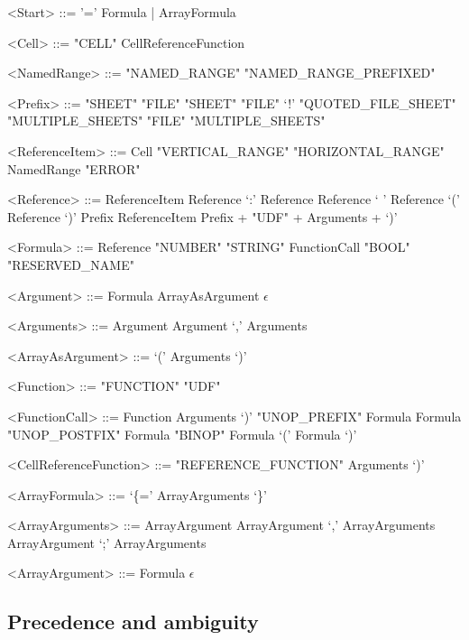 \documentclass[conference]{IEEEtran}
\begin{document}
\begin{grammar}
<Start> ::= '=' Formula | ArrayFormula


%
%
%
%

<Cell> ::= "CELL"
	  \alt CellReferenceFunction


<NamedRange> ::= "NAMED_RANGE"
            \alt "NAMED_RANGE_PREFIXED"

<Prefix> ::= "SHEET"
	\alt "FILE" "SHEET"
	\alt "FILE" `!'
	\alt "QUOTED_FILE_SHEET"
	\alt "MULTIPLE_SHEETS"
	\alt "FILE" "MULTIPLE_SHEETS"

<ReferenceItem> ::= Cell
	\alt "VERTICAL_RANGE"
	\alt "HORIZONTAL_RANGE"
	\alt NamedRange
	\alt "ERROR" 

<Reference> ::= ReferenceItem
	\alt Reference `:' Reference
	\alt Reference ` ' Reference
	\alt `(' Reference `)'
	\alt Prefix ReferenceItem
              \alt Prefix + "UDF" + Arguments + `)'
              
<Formula> ::= Reference
         \alt "NUMBER"
         \alt "STRING"
         \alt FunctionCall
         \alt "BOOL"
         \alt "RESERVED_NAME"

<Argument> ::= Formula
\alt ArrayAsArgument
\alt $\epsilon$

<Arguments> ::= Argument
\alt Argument `,' Arguments

<ArrayAsArgument> ::= `(' Arguments `)'

<Function> ::= "FUNCTION"
	\alt "UDF"

<FunctionCall> ::= Function Arguments `)'
\alt "UNOP_PREFIX" Formula
\alt Formula "UNOP_POSTFIX"
\alt Formula "BINOP" Formula
\alt `(' Formula `)'

<CellReferenceFunction> ::= "REFERENCE_FUNCTION" Arguments `)'

<ArrayFormula> ::= `\{=' ArrayArguments `\}' 

<ArrayArguments> ::= ArrayArgument
 \alt ArrayArgument `,' ArrayArguments
 \alt ArrayArgument `;' ArrayArguments
 
<ArrayArgument> ::= Formula
 \alt $\epsilon$


\end{grammar}

\subsection{Precedence and ambiguity}
\end{document}
